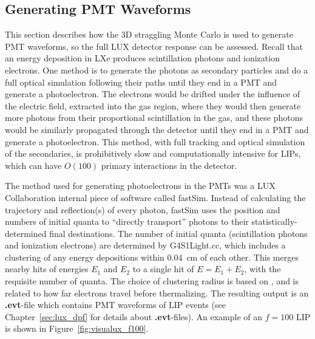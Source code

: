 \subsection{Generating PMT Waveforms}
This section describes how the 3D straggling Monte Carlo is used to generate \ac{PMT} waveforms, so the full \ac{LUX} detector response can be assessed. Recall that an energy deposition in \ac{LXe} produces scintillation photons and ionization electrons. One method is to generate the photons as secondary particles and do a full optical simulation following their paths until they end in a \ac{PMT} and generate a photoelectron. The electrons would be drifted under the influence of the electric field, extracted into the gas region, where they would then generate more photons from their proportional scintillation in the gas, and these photons would be similarly propagated through the detector until they end in a \ac{PMT} and generate a photoelectron. This method, with full tracking and optical simulation of the secondaries, is prohibitively slow and computationally intensive for \ac{LIP}s, which can have $O(100)$ primary interactions in the detector. 

The method used for generating photoelectrons in the \ac{PMT}s was a \ac{LUX} Collaboration internal piece of software called fastSim. Instead of calculating the trajectory and reflection(s) of every photon, fastSim uses the position and numbers of initial quanta to ``directly transport'' photons to their statistically-determined final destinations. The number of initial quanta (scintillation photons and ionization electrons) are determined by G4S1Light.cc, which includes a clustering of any energy depositions within 0.04~cm of each other. This merges nearby hits of energies $E_{1}$ and $E_{2}$ to a single hit of $E = E_{1} + E_{2}$, with the requisite number of quanta. The choice of clustering radius is based on \cite{Mozumder1995}, and is related to how far electrons travel before thermalizing. The resulting output is an \textbf{.evt}-file which contains \ac{PMT} waveforms of \ac{LIP} events (see Chapter~\ref{sec:lux_dpf} for details about \textbf{.evt}-files). An example of an $f=100$ \ac{LIP} is shown in Figure~\ref{fig:visualux_f100}.

